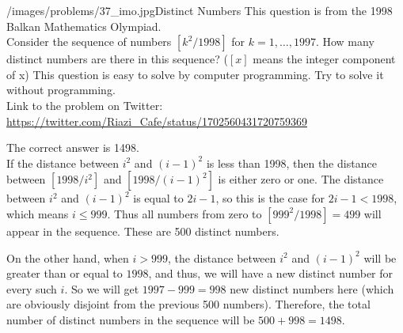 \begin{problem}{/images/problems/37_imo.jpg}{Distinct Numbers}
    This question is from the 1998 Balkan Mathematics Olympiad.\\[0.2cm]

Consider the sequence of numbers $[k^2/1998]$ for $k = 1, \ldots, 1997$. How many distinct numbers are there in this sequence? ($[x]$ means the integer component of x) This question is easy to solve by computer programming. Try to solve it without programming.\\[0.2cm]

Link to the problem on Twitter:  \url{https://twitter.com/Riazi_Cafe/status/1702560431720759369}
\end{problem}
\begin{solution}
The correct answer is 1498.\\[0.2cm]

If the distance between $i^2$ and $(i-1)^2$ is less than 1998, then the distance between $[1998/i^2]$ and $[1998/(i-1)^2]$ is either zero or one. The distance between $i^2$ and $(i-1)^2$ is equal to $2i-1$, so this is the case for $2i-1 < 1998$, which means $i \leq 999$. Thus all numbers from zero to $[999^2/1998]=499$ will appear in the sequence. These are 500 distinct numbers.

On the other hand, when $i > 999$, the distance between $i^2$ and $(i-1)^2$ will be greater than or equal to $1998$, and thus, we will have a new distinct number for every such $i$. So we will get $1997-999=998$ new distinct numbers here (which are obviously disjoint from the previous 500 numbers). Therefore, the total number of distinct numbers in the sequence will be $500+998=1498$.

\end{solution}